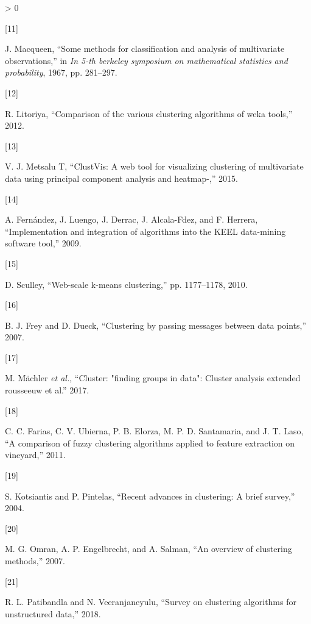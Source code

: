 \documentclass[
]{article}
\newlength{\cslhangindent}
\newlength{\csllabelwidth}
\newenvironment{CSLReferences}[3] %
 {%
  \setlength{\parindent}{0pt}
  \ifodd #1 \everypar{\setlength{\hangindent}{\cslhangindent}}\ignorespaces\fi
  \ifnum #2 > 0
  \setlength{\parskip}{#2\baselineskip}
  \fi
 }%
 {}
\newcommand{\CSLLeftMargin}[1]{\parbox[t]{\csllabelwidth}{#1}}
\newcommand{\CSLRightInline}[1]{\parbox[t]{\linewidth - \csllabelwidth}{#1}}
\begin{document}
\begin{CSLReferences}{0}{0}
\leavevmode\hypertarget{ref-b49}{}%
\CSLLeftMargin{{[}11{]} }
\CSLRightInline{J. Macqueen, {``Some methods for classification and
analysis of multivariate observations,''} in \emph{In 5-th berkeley
symposium on mathematical statistics and probability}, 1967, pp.
281--297.}

\leavevmode\hypertarget{ref-b13}{}%
\CSLLeftMargin{{[}12{]} }
\CSLRightInline{R. Litoriya, {``Comparison of the various clustering
algorithms of weka tools,''} 2012.}

\leavevmode\hypertarget{ref-b14}{}%
\CSLLeftMargin{{[}13{]} }
\CSLRightInline{V. J. Metsalu T, {``ClustVis: A web tool for visualizing
clustering of multivariate data using principal component analysis and
heatmap-,''} 2015.}

\leavevmode\hypertarget{ref-b15}{}%
\CSLLeftMargin{{[}14{]} }
\CSLRightInline{A. Fernández, J. Luengo, J. Derrac, J. Alcala-Fdez, and
F. Herrera, {``Implementation and integration of algorithms into the
KEEL data-mining software tool,''} 2009.}

\leavevmode\hypertarget{ref-b9}{}%
\CSLLeftMargin{{[}15{]} }
\CSLRightInline{D. Sculley, {``Web-scale k-means clustering,''} pp.
1177--1178, 2010.}

\leavevmode\hypertarget{ref-b10}{}%
\CSLLeftMargin{{[}16{]} }
\CSLRightInline{B. J. Frey and D. Dueck, {``Clustering by passing
messages between data points,''} 2007.}

\leavevmode\hypertarget{ref-b11}{}%
\CSLLeftMargin{{[}17{]} }
\CSLRightInline{M. Mächler \emph{et al.}, {``Cluster: "finding groups in
data": Cluster analysis extended rousseeuw et al.''} 2017.}

\leavevmode\hypertarget{ref-b12}{}%
\CSLLeftMargin{{[}18{]} }
\CSLRightInline{C. C. Farias, C. V. Ubierna, P. B. Elorza, M. P. D.
Santamaria, and J. T. Laso, {``A comparison of fuzzy clustering
algorithms applied to feature extraction on vineyard,''} 2011.}

\leavevmode\hypertarget{ref-b17}{}%
\CSLLeftMargin{{[}19{]} }
\CSLRightInline{S. Kotsiantis and P. Pintelas, {``Recent advances in
clustering: A brief survey,''} 2004.}

\leavevmode\hypertarget{ref-b18}{}%
\CSLLeftMargin{{[}20{]} }
\CSLRightInline{M. G. Omran, A. P. Engelbrecht, and A. Salman, {``An
overview of clustering methods,''} 2007.}

\leavevmode\hypertarget{ref-b8}{}%
\CSLLeftMargin{{[}21{]} }
\CSLRightInline{R. L. Patibandla and N. Veeranjaneyulu, {``Survey on
clustering algorithms for unstructured data,''} 2018.}


\end{CSLReferences}
\end{document}
